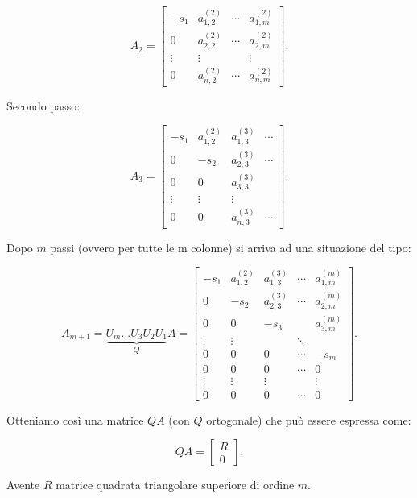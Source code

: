 \[ A_2 =
\left[
\begin{array}{cccc}
-s_1    & a_{1,2}^{(2)} & \cdots & a_{1,m}^{(2)} \\
0      & a_{2,2}^{(2)} & \cdots & a_{2,m}^{(2)} \\
\vdots & \vdots      &        & \vdots \\
0      & a_{n,2}^{(2)} & \cdots & a_{n,m}^{(2)}
\end{array}
\right].
\]

Secondo passo:

\[ A_3 =
\left[
\begin{array}{cccc}
-s_1   & a_{1,2}^{(2)}& a_{1,3}^{(3)} & \cdots  \\
0      & -s_2       & a_{2,3}^{(3)} & \cdots  \\
0      & 0          & a_{3,3}^{(3)} &         \\
\vdots & \vdots     & \vdots      &         \\
0      & 0          & a_{n,3}^{(3)} & \cdots
\end{array}
\right].
\]

Dopo $m$ passi (ovvero per tutte le m colonne) si arriva ad una situazione
del tipo:

\[ A_{m+1} = \underbrace{U_m...U_3U_2U_1}_{Q}A =
\left[
\begin{array}{ccccc}
-s_1   & a_{1,2}^{(2)}& a_{1,3}^{(3)} & \cdots  & a_{1,m}^{(m)} \\
0      & -s_2       & a_{2,3}^{(3)} & \cdots  & a_{2,m}^{(m)} \\
0      & 0          & -s_3        &         & a_{3,m}^{(m)} \\
\vdots & \vdots     &             & \ddots  & \\
0      & 0          & 0           & \cdots  & -s_m \\
0      & 0          & 0           & \cdots  & 0 \\
\vdots & \vdots     & \vdots      &         & \vdots \\
0      & 0          & 0           & \cdots  & 0
\end{array}
\right].
\]

Otteniamo così una matrice $QA$ (con $Q$ ortogonale) che può essere espressa come:

\[QA = \left[
\begin{array}{c}
R \\
0
\end{array}
\right].\]

\begin{flushleft}
Avente $R$ matrice quadrata triangolare superiore di ordine $m$.
\end{flushleft}

